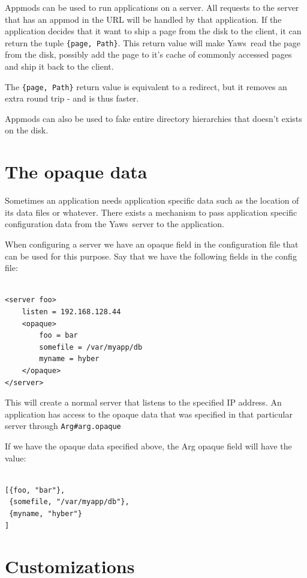 \documentclass[11pt,oneside,english]{book}
\newcommand{\Yaws}            %
        {{\sc Yaws}}
\begin{document}
Appmods can be used to run applications on a server. All requests
to the server that has an appmod in the URL will be handled by that
application. If the application decides that it want to
ship a page from the disk to the client, it can return the
tuple \verb+{page, Path}+. This return value will make \Yaws\  read
the page from the disk, possibly add the page to it's cache of
commonly accessed pages and ship it back to the client.

The \verb+{page, Path}+ return value is equivalent to a
redirect, but it removes an extra round trip - and is thus faster.

Appmods can also be used to fake entire directory hierarchies
that doesn't exists on the disk.


\section{The opaque data}

Sometimes an application needs application specific data
such as the location of its data files or whatever. There exists
a mechanism to pass application specific configuration data from the
\Yaws\  server to the application.

When configuring a server we have an opaque field in the
configuration file that can be used for this purpose.
Say that we have the following fields in the
config file:
\begin{verbatim}

<server foo>
    listen = 192.168.128.44
    <opaque>
        foo = bar
        somefile = /var/myapp/db
        myname = hyber
    </opaque>
</server>
\end{verbatim}

This will create a normal server that listens to the specified IP address.
An application has access to the opaque data that was specified
in that particular server through \verb+Arg#arg.opaque+

If we have the opaque data specified above, the Arg opaque field will
have the value:

\begin{verbatim}

[{foo, "bar"},
 {somefile, "/var/myapp/db"},
 {myname, "hyber"}
]

\end{verbatim}





\section{Customizations}
\end{document}

